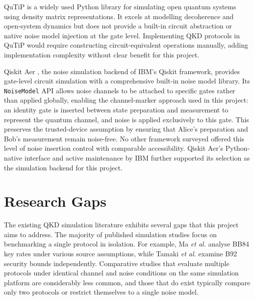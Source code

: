 QuTiP \cite{QuTiP2012} is a widely used Python library for simulating open quantum systems using density matrix representations. It excels at modelling decoherence and open-system dynamics but does not provide a built-in circuit abstraction or native noise model injection at the gate level. Implementing QKD protocols in QuTiP would require constructing circuit-equivalent operations manually, adding implementation complexity without clear benefit for this project.

Qiskit Aer \cite{QiskitAer}, the noise simulation backend of IBM's Qiskit framework, provides gate-level circuit simulation with a comprehensive built-in noise model library. Its \texttt{NoiseModel} API allows noise channels to be attached to specific gates rather than applied globally, enabling the channel-marker approach used in this project: an identity gate is inserted between state preparation and measurement to represent the quantum channel, and noise is applied exclusively to this gate. This preserves the trusted-device assumption by ensuring that Alice's preparation and Bob's measurement remain noise-free. No other framework surveyed offered this level of noise insertion control with comparable accessibility. Qiskit Aer's Python-native interface and active maintenance by IBM further supported its selection as the simulation backend for this project.



\section{Research Gaps}

The existing QKD simulation literature exhibits several gaps that this project aims to address. The majority of published simulation studies focus on benchmarking a single protocol in isolation. For example, Ma \textit{et al.} \cite{Ma2005} analyse BB84 key rates under various source assumptions, while Tamaki \textit{et al.} \cite{Tamaki2014} examine B92 security bounds independently. Comparative studies that evaluate multiple protocols under identical channel and noise conditions on the same simulation platform are considerably less common, and those that do exist typically compare only two protocols or restrict themselves to a single noise model.

